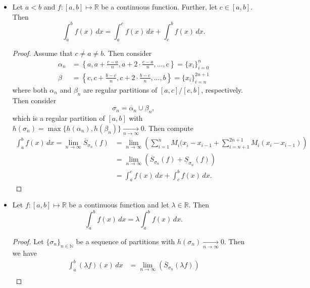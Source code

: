 \documentclass{article}
\newcommand{\R}{\mathbb{R}}
\newcommand{\N}{\mathbb{N}}
\newcommand{\?}{\stackrel{?}{=}}
\theoremstyle{definition} %
\begin{document}
\begin{itemize}
    \item[]
    \begin{lemma}
        Let $a < b$ and $f: [a, b] \mapsto \R$ be a continuous function. Further, let $c \in [a, b]$. Then
        $$\int_a^b f(x) \, dx = \int_a^c f(x) \, dx + \int_c^b f(x) \, dx.$$
    \end{lemma}
    \begin{proof}
        Assume that $c \neq a \neq b$. Then consider
        \begin{align*}
            \alpha_n &= \left\{a, a + \frac{c - a}{n}, a + 2 \cdot \frac{c - a}{n}, \ldots, c\right\} = \{x_i\}_{i = 0}^n \\
            \beta &= \left\{c, c + \frac{b - c}{n}, c + 2 \cdot \frac{b - c}{n}, \ldots, b\right\} = \{x_i\}_{i = n}^{2n + 1}
        \end{align*}
        where both $\alpha_n$ and $\beta_n$ are regular partitions of $[a, c]/[c, b]$, respectively. Then consider
        $$\sigma_n = \alpha_n \cup \beta_n,$$
        which is a regular partition of $[a, b]$ with $h(\sigma_n) = \max\{h(\alpha_n), h(\beta_n)\} \underset{n \rightarrow \infty}{\longrightarrow} 0$. Then compute
        \begin{align*}
            \int_a^b f(x) \,dx = \lim_{n \to \infty} \overline{S}_{\sigma_n}(f) &= \lim_{n \to \infty} \left(\sum_{i = 1}^n M_i (x_i - x_{i - 1} + \sum_{i = n + 1}^{2n + 1} M_i (x_i - x_{i - 1}) \right) \\
            &= \lim_{n \to \infty} \left(\overline{S}_{\sigma_n}(f) + \underline{S}_{\sigma_n}(f)\right) \\
            &= \int_a^c f(x)\,dx + \int_c^b f(x) \,dx.
        \end{align*}
    \end{proof}
    \item[]
    \begin{lemma}
        Let $f: [a, b] \mapsto \R$ be a continuous function and let $\lambda \in \R$. Then
        $$\int_a^b f(x) \,dx = \lambda \int_a^b f(x) \,dx.$$
    \end{lemma}
    \begin{proof}
        Let $\{\sigma_n\}_{n \in \N}$ be a sequence of partitions with $h(\sigma_n) \underset{n \rightarrow \infty}{\longrightarrow} 0$. Then we have
        \begin{align*}
            \int_a^b (\lambda f)(x) \,dx &= \lim_{n \to \infty} \left(\overline{S}_{\sigma_n}(\lambda f)\right) \\

\end{align*}
\end{proof}
\end{itemize}
\end{document}
